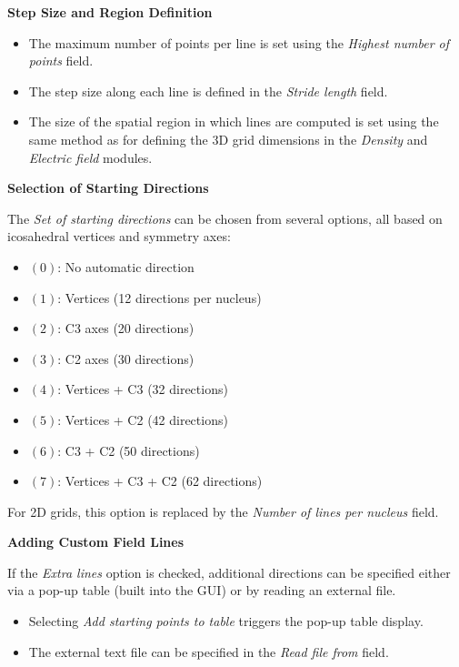 \documentclass[10pt]{article}
\begin{document}
\vspace*{3mm}
{\bf Step Size and Region Definition}
\vspace*{3mm}

\begin{itemize}
\item The maximum number of points per line is set using the {\it Highest number of points} field.
\item The step size along each line is defined in the {\it Stride length} field.
\item The size of the spatial region in which lines are computed is set
using the same method as for defining the 3D grid dimensions
in the {\it Density} and {\it Electric field} modules.
\end{itemize}

\vspace*{3mm}
{\bf Selection of Starting Directions}
\vspace*{3mm}

The {\it Set of starting directions} can be chosen
from several options, all based on icosahedral vertices and symmetry axes:

\begin{itemize}
\item $(0)$: No automatic direction
\item $(1)$: Vertices (12 directions per nucleus)
\item $(2)$: C3 axes (20 directions)
\item $(3)$: C2 axes (30 directions)
\item $(4)$: Vertices + C3 (32 directions)
\item $(5)$: Vertices + C2 (42 directions)
\item $(6)$: C3 + C2 (50 directions)
\item $(7)$: Vertices + C3 + C2 (62 directions)
\end{itemize}

For 2D grids, this option is replaced by the {\it Number of lines per nucleus} field.

\vspace*{3mm}
{\bf Adding Custom Field Lines}
\vspace*{3mm}

If the {\it Extra lines} option is checked, additional directions
can be specified either via a pop-up table (built into the GUI)
or by reading an external file.

\begin{itemize}
\item Selecting {\it Add starting points to table} triggers the pop-up table display.
\item The external text file can be specified in the {\it Read file from} field.
\end{itemize}
\end{document}
